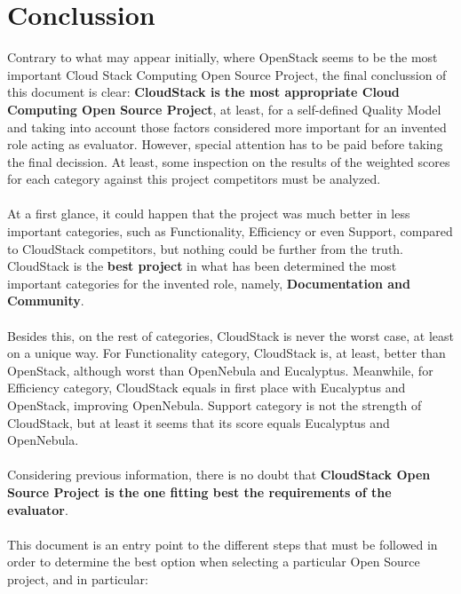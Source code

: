 \documentclass[11pt]{article}
\begin{document}
\section{Conclussion} \label{sec:conclussion}
Contrary to what may appear initially, where OpenStack seems to be the most important Cloud Stack Computing Open Source Project, the final conclussion of this document is clear: \textbf{CloudStack is the most appropriate Cloud Computing Open Source Project}, at least, for a self-defined Quality Model and taking into account those factors considered more important for an invented role acting as evaluator. However, special attention has to be paid before taking the final decission. At least, some inspection on the results of the weighted scores for each category against this project competitors must be analyzed.\\
\\
At a first glance, it could happen that the project was much better in less important categories, such as Functionality, Efficiency or even Support, compared to CloudStack competitors, but nothing could be further from the truth. CloudStack is the \textbf{best project} in what has been determined the most important categories for the invented role, namely, \textbf{Documentation and Community}.\\
\\
Besides this, on the rest of categories, CloudStack is never the worst case, at least on a unique way. For Functionality category, CloudStack is, at least, better than OpenStack, although worst than OpenNebula and Eucalyptus. Meanwhile, for Efficiency category, CloudStack equals in first place with Eucalyptus and OpenStack, improving OpenNebula. Support category is not the strength of CloudStack, but at least it seems that its score equals Eucalyptus and OpenNebula.\\
\\
Considering previous information, there is no doubt that \textbf{CloudStack Open Source Project is the one fitting best the requirements of the evaluator}.\\
\\
This document is an entry point to the different steps that must be followed in order to determine the best option when selecting a particular Open Source project, and in particular:
\end{document}
